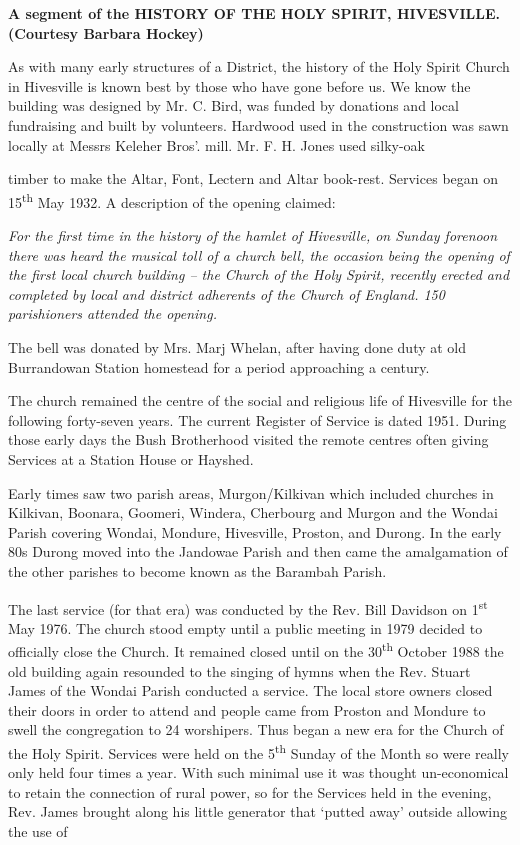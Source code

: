 \textbf{A segment of the HISTORY OF THE HOLY SPIRIT, HIVESVILLE. (Courtesy Barbara Hockey)}

As with many early structures of a District, the history of the Holy Spirit Church in Hivesville is known best by those who have gone before us. We know the building was designed by Mr. C. Bird, was funded by donations and local fundraising and built by volunteers. Hardwood used in the construction was sawn locally at Messrs Keleher Bros'. mill. Mr. F. H. Jones used silky-oak

timber to make the Altar, Font, Lectern and Altar book-rest. Services began on 15\textsuperscript{th} May 1932. A description of the opening claimed:

\emph{For the first time in the history of the hamlet of Hivesville, on Sunday forenoon there was heard the musical toll of a church bell, the occasion being the opening of the first local church building -- the Church of the Holy Spirit, recently erected and completed by local and district adherents of the Church of England. 150 parishioners attended the opening.}

The bell was donated by Mrs. Marj Whelan, after having done duty at old Burrandowan Station homestead for a period approaching a century.

The church remained the centre of the social and religious life of Hivesville for the following forty-seven years. The current Register of Service is dated 1951. During those early days the Bush Brotherhood visited the remote centres often giving Services at a Station House or Hayshed.

Early times saw two parish areas, Murgon/Kilkivan which included churches in Kilkivan, Boonara, Goomeri, Windera, Cherbourg and Murgon and the Wondai Parish covering Wondai, Mondure, Hivesville, Proston, and Durong. In the early 80s Durong moved into the Jandowae Parish and then came the amalgamation of the other parishes to become known as the Barambah Parish.

The last service (for that era) was conducted by the Rev. Bill Davidson on 1\textsuperscript{st} May 1976. The church stood empty until a public meeting in 1979 decided to officially close the Church. It remained closed until on the 30\textsuperscript{th} October 1988 the old building again resounded to the singing of hymns when the Rev. Stuart James of the Wondai Parish conducted a service. The local store owners closed their doors in order to attend and people came from Proston and Mondure to swell the congregation to 24 worshipers. Thus began a new era for the Church of the Holy Spirit. Services were held on the 5\textsuperscript{th} Sunday of the Month so were really only held four times a year. With such minimal use it was thought un-economical to retain the connection of rural power, so for the Services held in the evening, Rev. James brought along his little generator that `putted away' outside allowing the use of

